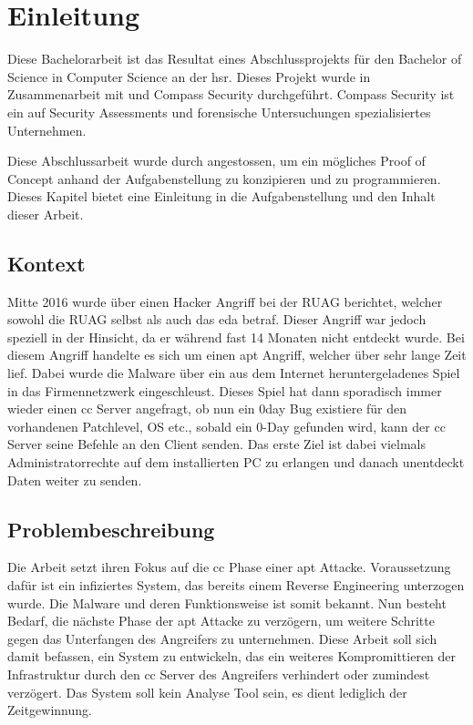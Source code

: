 \chapter{Einleitung}

Diese Bachelorarbeit ist das Resultat eines Abschlussprojekts für den Bachelor of Science in Computer Science an der \gls{hsr}.
Dieses Projekt wurde in Zusammenarbeit mit \ibuf und Compass Security durchgeführt.
Compass Security ist ein auf Security Assessments und forensische Untersuchungen spezialisiertes Unternehmen.

Diese Abschlussarbeit wurde durch \ibuf angestossen, um ein mögliches Proof of Concept anhand der Aufgabenstellung zu konzipieren und zu programmieren.
Dieses Kapitel bietet eine Einleitung in die Aufgabenstellung und den Inhalt dieser Arbeit.

\section{Kontext}
\label{intro:context}
Mitte 2016\cite{intro:ruag} wurde über einen Hacker Angriff bei der RUAG berichtet, welcher sowohl die RUAG selbst als auch das \gls{eda} betraf.
Dieser Angriff war jedoch speziell in der Hinsicht, da er während fast 14 Monaten nicht entdeckt wurde.
Bei diesem Angriff handelte es sich um einen \gls{apt} Angriff, welcher über sehr lange Zeit lief. Dabei wurde die Malware über ein aus dem Internet heruntergeladenes Spiel in das Firmennetzwerk eingeschleust.
Dieses Spiel hat dann sporadisch immer wieder einen \gls{cc} Server angefragt, ob nun ein \gls{0day} Bug existiere für den vorhandenen Patchlevel, OS etc., sobald ein 0-Day gefunden wird, kann der \gls{cc} Server seine Befehle an den Client senden.
Das erste Ziel ist dabei vielmals Administratorrechte auf dem installierten PC zu erlangen und danach unentdeckt Daten weiter zu senden.


\section{Problembeschreibung}
\label{intro:problem}
Die Arbeit setzt ihren Fokus auf die \gls{cc} Phase einer \gls{apt} Attacke. Voraussetzung dafür ist ein infiziertes System, das bereits einem Reverse Engineering unterzogen wurde. Die Malware und deren Funktionsweise ist somit bekannt. Nun besteht Bedarf, die nächste Phase der \gls{apt} Attacke zu verzögern, um weitere Schritte gegen das Unterfangen des Angreifers zu unternehmen. Diese Arbeit soll sich damit befassen, ein System zu entwickeln, das ein weiteres Kompromittieren der Infrastruktur durch den \gls{cc} Server des Angreifers verhindert oder zumindest verzögert. Das System soll kein Analyse Tool sein, es dient lediglich der Zeitgewinnung.



